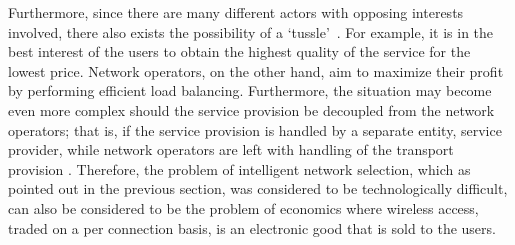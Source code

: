 Furthermore, since there are many different actors with opposing interests involved, there also exists the possibility of a `tussle'~\cite{Clark02}. For example, it is in the best interest of the users to obtain the highest quality of the service for the lowest price. Network operators, on the other hand, aim to maximize their profit by performing efficient load balancing. Furthermore, the situation may become even more complex should the service provision be decoupled from the network operators; that is, if the service provision is handled by a separate entity, service provider, while network operators are left with handling of the transport provision \cite{DMBushTussle09}. Therefore, the problem of intelligent network selection, which as pointed out in the previous section, was considered to be technologically difficult, can also be considered to be the problem of economics where wireless access, traded on a per connection basis, is an electronic good that is sold to the users.

